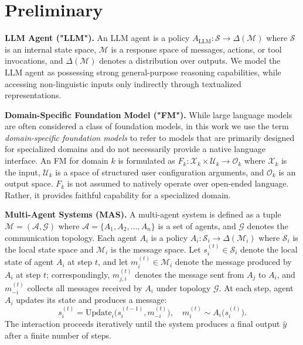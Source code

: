 \section{Preliminary}

\textbf{LLM Agent ("LLM").} An LLM agent \cite{DBLP:journals/fcsc/WangMFZYZCTCLZWW24, DBLP:journals/corr/abs-2503-21460} is a policy
$A_{\mathrm{LLM}} : \mathcal{S} \to \Delta(\mathcal{M})$
where $\mathcal{S}$ is an internal state space, $\mathcal{M}$ is a response space of messages, actions, or tool invocations, and $\Delta(\mathcal{M})$ denotes a distribution over outputs.
We model the LLM agent as possessing strong general-purpose reasoning capabilities, while accessing non-linguistic inputs only indirectly through textualized representations.

\textbf{Domain-Specific Foundation Model ("FM").} While large language models are often considered a class of foundation models, in this work we use the term \emph{domain-specific foundation models} to refer to models that are primarily designed for specialized domains and do not necessarily provide a native language interface. 
An FM for domain $k$ is formulated as
$F_k : \mathcal{X}_k \times \mathcal{U}_k \to \mathcal{O}_k$
where $\mathcal{X}_k$ is the input, $\mathcal{U}_k$ is a space of structured user configuration arguments, and $\mathcal{O}_k$ is an output space.
$F_k$ is not assumed to natively operate over open-ended language. Rather, it provides faithful capability for a specialized domain.


\textbf{Multi-Agent Systems (MAS).}
A multi-agent system is defined as a tuple $\mathcal{M} = (\mathcal{A}, \mathcal{G})$ where $\mathcal{A} = \{A_1, A_2, \dots, A_n\}$ is a set of agents, and $\mathcal{G}$ denotes the communication topology.
Each agent $A_i$ is a policy $A_i : \mathcal{S}_i \to \Delta(\mathcal{M}_i)$
where $\mathcal{S}_i$ is the local state space and $\mathcal{M}_i$ is the message space.
Let $s_i^{(t)} \in \mathcal{S}_i$ denote the local state of agent $A_i$ at step $t$, and let $m_i^{(t)} \in \mathcal{M}_i$ denote the message produced by $A_i$ at step $t$; correspondingly, $m_{j,i}^{(t)}$ denotes the message sent from $A_j$ to $A_i$, and $m_{-i}^{(t)}$ collects all messages received by $A_i$ under topology $\mathcal{G}$. At each step, agent $A_i$ updates its state and produces a message:
\begin{equation}
    s_i^{(t)} = \mathrm{Update}_i\big(s_i^{(t-1)}, m_{-i}^{(t)}\big), 
    \quad
    m_i^{(t)} \sim A_i\big(s_i^{(t)}\big).
\end{equation}
The interaction proceeds iteratively until the system produces a final output $\hat{y}$ after a finite number of steps.




